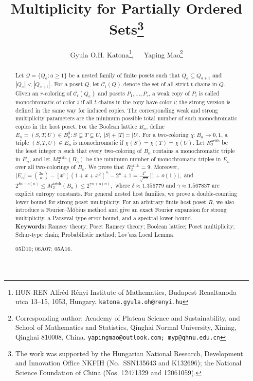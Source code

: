 \documentclass[twoside,12pt]{article}
\begin{document}
\title{\textbf{Multiplicity for Partially Ordered Sets\footnote{The work was supported by the Hungarian National Research, Development and Innovation Office NKFIH (No.~SSN135643 and K132696); the National Science Foundation of China (Nos. 12471329 and 12061059).}}}

\author{Gyula O.H. Katona\thanks{HUN-REN Alfr\'ed R\'enyi Institute of Mathematics, Budapest Reaaltanoda utca 13--15, 1053, Hungary. {\tt katona.gyula.oh@renyi.hu}},\ \ \ Yaping Mao\footnote{Corresponding author: Academy of Plateau Science and Sustainability, and School of Mathematics and Statistics, Qinghai Normal University, Xining, Qinghai 810008, China. {\tt yapingmao@outlook.com; myp@qhnu.edu.cn}}}
\date{}
\maketitle

\begin{abstract}
Let $\mathcal Q=\{Q_a:a\geq1\}$ be a nested family of finite posets such that $Q_a\subseteq Q_{a+1}$ and $|Q_a|<|Q_{a+1}|$. For a poset $Q$, let $\mathcal C_t(Q)$ denote the set of all strict $t$-chains in $Q$. Given an $r$-coloring of $\mathcal C_t(Q_a)$ and posets $P_1,\ldots,P_r$, a weak copy of $P_i$ is called monochromatic of color $i$ if all $t$-chains in the copy have color $i$; the strong version is defined in the same way for induced copies. The corresponding weak and strong multiplicity parameters are the minimum possible total number of such monochromatic copies in the host poset.
For the Boolean lattice $B_n$, define
$E_n={(S,T,U)\in B_n^3:S\subsetneq T\subsetneq U,\ |S|+|T|=|U|}.$
For a two-coloring $\chi:B_n\to{0,1}$, a triple $(S,T,U)\in E_n$ is monochromatic if
$\chi(S)=\chi(T)=\chi(U)$. Let $R^{\mathrm{arith}}_2$ be the least integer $n$ such that every two-coloring of $B_n$ contains a monochromatic triple in $E_n$, and let $M^{\mathrm{arith}}_2(B_n)$ be the minimum number of monochromatic triples in $E_n$ over all two-colorings of $B_n$. We prove that
$R^{\mathrm{arith}}_2=9.$
Moreover,
$|E_n|=\binom{2n}{n}-[x^n](1+x+x^2)^n-2^n+1
=\frac{4^n}{\sqrt{\pi n}}\bigl(1+o(1)\bigr),$
and
$
2^{\delta n+o(n)}
\le M^{\mathrm{arith}}_2(B_n)
\le 2^{\gamma n+o(n)},
$
where $\delta\approx 1.356779$ and $\gamma\approx 1.567837$ are explicit entropy constants.
For general nested host families, we prove a double-counting lower bound for strong poset multiplicity. For an arbitrary finite host poset $R$, we also introduce a Fourier--M\"obius method and give an exact Fourier expansion for strong multiplicity, a Parseval-type error bound, and a spectral lower bound.\\[0.2cm]
{\bf Keywords:} Ramsey theory; Poset Ramsey theory; Boolean lattice; Poset multiplicity; Schur-type chain; Probabilistic method; Lov'asz Local Lemma.

 05D10; 06A07; 05A16.
\end{abstract}
\end{document}
